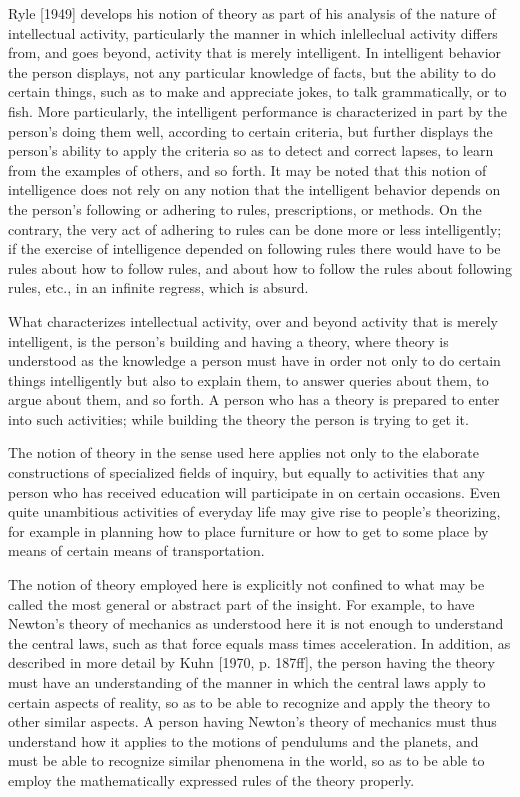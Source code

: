 \documentclass[12pt,letterpaper,twocolumn]{article}
\begin{document}
Ryle [1949] develops his notion of theory as part of his analysis of the nature of intellectual activity, particularly the manner in which inlelleclual activity differs from, and goes beyond, activity that is merely intelligent. In intelligent behavior the person displays, not any particular knowledge of facts, but the ability to do certain things, such as to make and appreciate jokes, to talk grammatically, or to fish. More particularly, the intelligent performance is characterized in part by the person's doing them well, according to certain criteria, but further displays the person's ability to apply the criteria so as to detect and correct lapses, to learn from the examples of others, and so forth. It may be noted that this notion of intelligence does not rely on any notion that the intelligent behavior depends on the person's following or adhering to rules, prescriptions, or methods. On the contrary, the very act of adhering to rules can be done more or less intelligently; if the exercise of intelligence depended on following rules there would have to be rules about how to follow rules, and about how to follow the rules about following rules, etc., in an infinite regress, which is absurd.

What characterizes intellectual activity, over and beyond activity that is merely intelligent, is the person's building and having a theory, where theory is understood as the knowledge a person must have in order not only to do certain things intelligently but also to explain them, to answer queries about them, to argue about them, and so forth. A person who has a theory is prepared to enter into such activities; while building the theory the person is trying to get it.

The notion of theory in the sense used here applies not only to the elaborate constructions of specialized fields of inquiry, but equally to activities that any person who has received education will participate in on certain occasions. Even quite unambitious activities of everyday life may give rise to people's theorizing, for example in planning how to place furniture or how to get to some place by means of certain means of transportation.

The notion of theory employed here is explicitly not confined to what may be called the most general or abstract part of the insight. For example, to have Newton's theory of mechanics as understood here it is not enough to understand the central laws, such as that force equals mass times acceleration. In addition, as described in more detail by Kuhn [1970, p. 187ff], the person having the theory must have an understanding of the manner in which the central laws apply to certain aspects of reality, so as to be able to recognize and apply the theory to other similar aspects. A person having Newton's theory of mechanics must thus understand how it applies to the motions of pendulums and the planets, and must be able to recognize similar phenomena in the world, so as to be able to employ the mathematically expressed rules of the theory properly.
\end{document}
